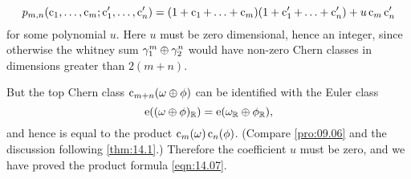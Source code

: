 \documentclass[../main]{subfiles}
\begin{document}
\[
p_{m, n}(\operatorname{c}_{1}, \ldots, \operatorname{c}_{m} ; \operatorname{c}_{1}^{\prime}, \ldots, \operatorname{c}_{n}^{\prime})=(1+\operatorname{c}_{1}+\ldots+\operatorname{c}_{m})(1+\operatorname{c}_{1}^{\prime}+\ldots+\operatorname{c}_{n}^{\prime})+u\operatorname{c}_{m} \operatorname{c}_{n}^{\prime}
\]
for some polynomial $u$. Here $u$ must be zero dimensional, hence an integer, since otherwise the whitney sum $\gamma_1^m\oplus \gamma_2^n$ would have non-zero Chern classes in dimensions greater than $2(m+n)$.

But the top Chern class $\operatorname{c}_{m+n}(\omega \oplus \phi)$ can be identified with the Euler class
\[
\operatorname{e}((\omega \oplus \phi)_{\mathbb{R}})=\operatorname{e}(\omega_{\mathbb{R}} \oplus \phi_{\mathbb{R}}),
\]
and hence is equal to the product $\operatorname{c}_{m}(\omega) \operatorname{c}_{n}(\phi)$. (Compare \ref{pro:09.06} and the discussion following \ref{thm:14.1}.) Therefore the coefficient $u$ must be zero, and we have proved the product formula \ref{eqn:14.07}.\newpage
\end{document}
